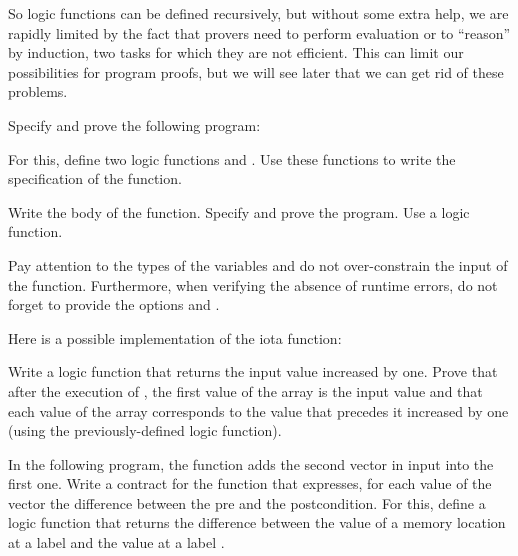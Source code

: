 So logic functions can be defined recursively, but without some extra
help, we are rapidly limited by the fact that provers need to
perform evaluation or to ``reason'' by induction, two tasks for which
they are not efficient. This can limit our possibilities for program
proofs, but we will see later that we can get rid of these problems.







Specify and prove the following program:






For this, define two logic functions  and .
Use these functions to write the specification of the function.





Write the body of the  function. Specify and prove the
program. Use a  logic function.




Pay attention to the types of the variables and do not over-constrain the input of
the function. Furthermore, when verifying the absence of runtime errors, do not
forget to provide the options  and
.




Here is a possible implementation of the iota function:




Write a logic function that returns the input value increased by one. Prove
that after the execution of , the first value of the array is
the input value and that each value of the array corresponds to the value that
precedes it increased by one (using the previously-defined logic function).






In the following program, the  function adds the second
vector in input into the first one. Write a contract for the function
 that expresses, for each value of the vector
 the difference between the pre and the postcondition. For this,
define a logic function  that returns the difference between
the value of a memory location at a label  and the value at a
label .


